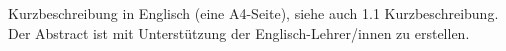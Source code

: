 Kurzbeschreibung in Englisch (eine A4-Seite), siehe auch 1.1 Kurzbeschreibung.
Der Abstract ist mit Unterstützung der Englisch-Lehrer/innen zu erstellen.
